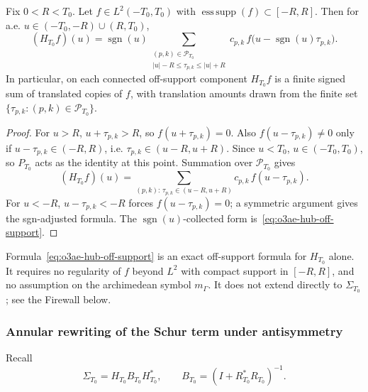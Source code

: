 \begin{theorem}
\label{thm:o3ae-hub-off-support}
Fix \(0<R<T_0\).  Let \(f\in L^2(-T_0,T_0)\) with
\(\operatorname{ess\,supp}(f)\subset[-R,R]\).  Then for a.e. \(u\in(-T_0,-R)\cup(R,T_0)\),
\[
 \boxed{
 (H_{T_0}f)(u)
 =\operatorname{sgn}(u)\!\!\sum_{\substack{(p,k)\in\mathcal P_{T_0}\\
   |u|-R\le\tau_{p,k}\le|u|+R}}\!\!\!\!c_{p,k}\,f\bigl(u-\operatorname{sgn}(u)\tau_{p,k}\bigr).
 }
\tag{O3AE.2}\label{eq:o3ae-hub-off-support}
\]
In particular, on each connected off-support component \(H_{T_0}f\) is a finite
signed sum of translated copies of \(f\), with translation amounts drawn from
the finite set \(\{\tau_{p,k}:(p,k)\in\mathcal P_{T_0}\}\).
\end{theorem}

\begin{proof}
For \(u>R\), \(u+\tau_{p,k}>R\), so \(f(u+\tau_{p,k})=0\).  Also
\(f(u-\tau_{p,k})\ne0\) only if \(u-\tau_{p,k}\in(-R,R)\), i.e.
\(\tau_{p,k}\in(u-R,u+R)\).  Since \(u<T_0\),
\(u\in(-T_0,T_0)\), so \(P_{T_0}\) acts as the identity at this point.
Summation over \(\mathcal P_{T_0}\) gives
\[
 (H_{T_0}f)(u)
 =\sum_{(p,k):\,\tau_{p,k}\in(u-R,u+R)}c_{p,k}\,f(u-\tau_{p,k}).
\]
For \(u<-R\), \(u-\tau_{p,k}<-R\) forces
\(f(u-\tau_{p,k})=0\); a symmetric argument gives the sgn-adjusted formula.  The
\(\operatorname{sgn}(u)\)-collected form is~\eqref{eq:o3ae-hub-off-support}.
\end{proof}

\begin{remark}
\label{rem:o3ae-scope}
Formula~\eqref{eq:o3ae-hub-off-support} is an exact off-support formula for
\(H_{T_0}\) alone.  It requires no regularity of \(f\) beyond \(L^2\) with
compact support in \([-R,R]\), and no assumption on the archimedean symbol
\(m_\Gamma\).  It does not extend directly to \(\Sigma_{T_0}\); see the
Firewall below.
\end{remark}

\subsubsection*{Annular rewriting of the Schur term under antisymmetry}

Recall
\[
 \Sigma_{T_0}=H_{T_0}B_{T_0}H_{T_0}^*,\qquad
 B_{T_0}=(I+R_{T_0}^*R_{T_0})^{-1}.
\]

